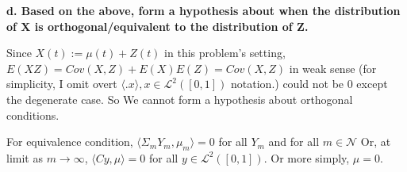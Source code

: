 \documentclass{article}
\begin{document}
\textbf{
d. Based on the above, form a hypothesis about when the distribution of X is orthogonal/equivalent 
to the distribution of Z.
}

Since $X(t):=\mu(t)+Z(t)$ in this problem's setting, 
$E(XZ)=Cov(X,Z)+E(X)E(Z)=Cov(X,Z)$ in weak sense (for simplicity, I omit overt $\langle .x \rangle, x\in \mathcal{L}^2([0,1])$ notation.)
could not be 0 except the degenerate case. So We cannot form a hypothesis about orthogonal conditions.

For equivalence condition, $\langle \Sigma_mY_m, \mu_m\rangle=0$ for all $Y_m$ and for all $m\in\mathcal{N}$
Or, at limit as $m\rightarrow\infty$, $\langle Cy, \mu\rangle=0$ for all $y\in\mathcal{L}^2([0,1])$.
Or more simply, $\mu=0$.
\end{document}
